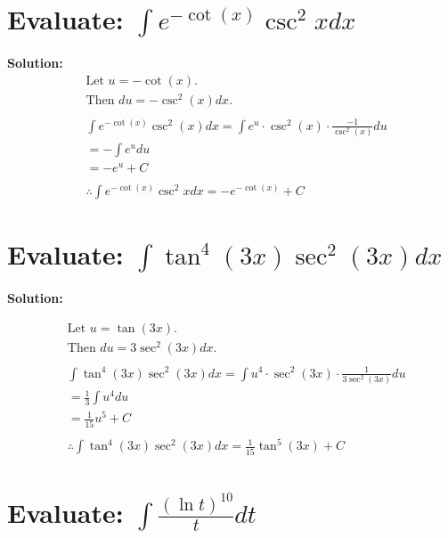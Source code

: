 \documentclass{article}
\begin{document}
\section{Evaluate: $\int e^{-\cot(x)} \csc^2 x dx$}
\textbf{Solution:}
\begin{align*}
     & \text{Let } u = -\cot(x).                                                               \\
     & \text{Then } du = -\csc^2(x) dx.                                                        \\
    \\
     & \int e^{-\cot(x)} \csc^2(x) dx = \int e^u \cdot \csc^2(x) \cdot \frac{-1}{\csc^2(x)} du \\
     & = -\int e^u du                                                                          \\
     & = -e^u + C                                                                              \\
    \\
     & \therefore \int e^{-\cot(x)} \csc^2 x dx = {-e^{-\cot(x)} + C}
\end{align*}

\section{Evaluate: $\int \tan^4(3x) \sec^2(3x) dx$}

\textbf{Solution:}

\begin{align*}
     & \text{Let } u = \tan(3x).                                                                 \\
     & \text{Then } du = 3 \sec^2(3x) dx.                                                        \\
    \\
     & \int \tan^4(3x) \sec^2(3x) dx = \int u^4 \cdot \sec^2(3x) \cdot \frac{1}{3 \sec^2(3x)} du \\
     & = \frac{1}{3} \int u^4 du                                                                 \\
     & = \frac{1}{15} u^5 + C                                                                    \\
    \\
     & \therefore \int \tan^4(3x) \sec^2(3x) dx = {\frac{1}{15} \tan^5(3x) + C}
\end{align*}

\newpage
\section{Evaluate: $\int \frac{(\ln t)^{10}}{t} dt$}
\end{document}
